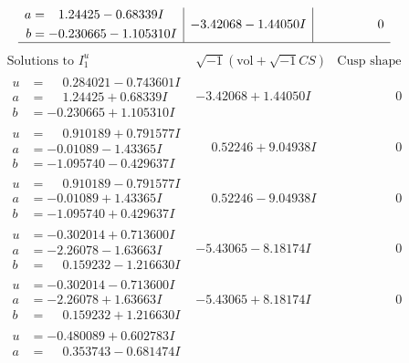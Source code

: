 \documentclass[1p]{elsarticle_modified}
\theoremstyle{definition}
\newcommand{\I}{\sqrt{-1}}
\begin{document}
$$\begin{array}{c|c|c}
\begin{aligned}
a &= \phantom{-}1.24425 - 0.68339 I \\
b &= -0.230665 - 1.105310 I\end{aligned}
 & -3.42068 - 1.44050 I & \phantom{-0.000000 } 0\\
 \hline 
 \end{array}$$\newpage$$\begin{array}{c|c|c}  
\text{Solutions to }I^u_{1}& \I (\text{vol} + \sqrt{-1}CS) & \text{Cusp shape}\\
 \hline 
\begin{aligned}
u &= \phantom{-}0.284021 - 0.743601 I \\
a &= \phantom{-}1.24425 + 0.68339 I \\
b &= -0.230665 + 1.105310 I\end{aligned}
 & -3.42068 + 1.44050 I & \phantom{-0.000000 } 0 \\ \hline\begin{aligned}
u &= \phantom{-}0.910189 + 0.791577 I \\
a &= -0.01089 - 1.43365 I \\
b &= -1.095740 - 0.429637 I\end{aligned}
 & \phantom{-}0.52246 + 9.04938 I & \phantom{-0.000000 } 0 \\ \hline\begin{aligned}
u &= \phantom{-}0.910189 - 0.791577 I \\
a &= -0.01089 + 1.43365 I \\
b &= -1.095740 + 0.429637 I\end{aligned}
 & \phantom{-}0.52246 - 9.04938 I & \phantom{-0.000000 } 0 \\ \hline\begin{aligned}
u &= -0.302014 + 0.713600 I \\
a &= -2.26078 - 1.63663 I \\
b &= \phantom{-}0.159232 - 1.216630 I\end{aligned}
 & -5.43065 - 8.18174 I & \phantom{-0.000000 } 0 \\ \hline\begin{aligned}
u &= -0.302014 - 0.713600 I \\
a &= -2.26078 + 1.63663 I \\
b &= \phantom{-}0.159232 + 1.216630 I\end{aligned}
 & -5.43065 + 8.18174 I & \phantom{-0.000000 } 0 \\ \hline\begin{aligned}
u &= -0.480089 + 0.602783 I \\
a &= \phantom{-}0.353743 - 0.681474 I \\

\end{aligned}
\end{array}$$
\end{document}
